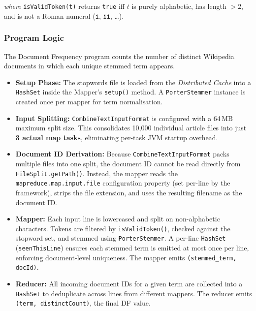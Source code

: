 \documentclass[12pt,a4paper]{article}
\begin{document}
\smallskip
\noindent\textit{where} \texttt{isValidToken(t)} returns \texttt{true} iff $t$
is purely alphabetic, has length $> 2$, and is not a Roman numeral
(\texttt{i}, \texttt{ii}, \ldots).

\subsubsection{Program Logic}

The Document Frequency program counts the number of distinct Wikipedia
documents in which each unique stemmed term appears.

\begin{itemize}[leftmargin=1.4em]
    \item \textbf{Setup Phase:} The stopwords file is loaded from the
    \emph{Distributed Cache} into a \texttt{HashSet} inside the Mapper's
    \texttt{setup()} method.  A \texttt{PorterStemmer} instance is created
    once per mapper for term normalisation.

    \item \textbf{Input Splitting:} \texttt{CombineTextInputFormat} is
    configured with a 64\,MB maximum split size.  This consolidates 10,000
    individual article files into just \textbf{3 actual map tasks}, eliminating
    per-task JVM startup overhead.

    \item \textbf{Document ID Derivation:} Because
    \texttt{CombineTextInputFormat} packs multiple files into one split, the
    document ID cannot be read directly from \texttt{FileSplit.getPath()}.
    Instead, the mapper reads the \texttt{mapreduce.map.input.file}
    configuration property (set per-line by the framework), strips the file
    extension, and uses the resulting filename as the document ID.

    \item \textbf{Mapper:} Each input line is lowercased and split on
    non-alphabetic characters.  Tokens are filtered by \texttt{isValidToken()},
    checked against the stopword set, and stemmed using \texttt{PorterStemmer}.
    A per-line \texttt{HashSet} (\texttt{seenThisLine}) ensures each stemmed
    term is emitted at most once per line, enforcing document-level uniqueness.
    The mapper emits \texttt{(stemmed\_term, docId)}.

    \item \textbf{Reducer:} All incoming document IDs for a given term are
    collected into a \texttt{HashSet} to deduplicate across lines from different
    mappers.  The reducer emits \texttt{(term, distinctCount)}, the final DF
    value.
\end{itemize}
\end{document}
